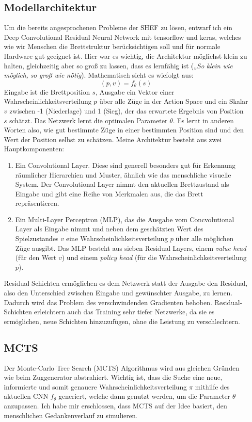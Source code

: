 \documentclass{jpp}
\begin{document}
\subsection{Modellarchitektur}
Um die bereits angesprochenen Probleme der SHEF zu lösen, entwarf ich ein Deep Convolutional Residual Neural Network mit tensorflow und keras, welches wie wir Menschen die Brettstruktur berücksichtigen soll und für normale Hardware gut geeignet ist. Hier war es wichtig, die Architektur möglichst klein zu halten, gleichzeitig aber so groß zu lassen, dass es lernfähig ist (\textit{„So klein wie möglich, so groß wie nötig}). Mathematisch sieht es wiefolgt aus:
\[(p, v) =  f_\theta(s)\]Eingabe ist die Brettposition $s$, Ausgabe ein Vektor einer Wahrscheinlichkeitsverteilung $p$ über alle Züge in der Action Space und ein Skalar $v$ zwischen -1 (Niederlage) und 1 (Sieg), der das erwartete Ergebnis von Position $s$ schätzt. Das Netzwerk lernt die optimalen Parameter $\theta$. Es lernt in anderen Worten also, wie gut bestimmte Züge in einer bestimmten Position sind und den Wert der Position selbst zu schätzen. 
Meine Architektur besteht aus zwei Hauptkomponenten:
\begin{enumerate}
\item Ein Convolutional Layer. Diese sind generell besonders gut für Erkennung räumlicher Hierarchien und Muster, ähnlich wie das menschliche visuelle System. Der Convolutional Layer nimmt den aktuellen Brettzustand als Eingabe und gibt eine Reihe von Merkmalen aus, die das Brett repräsentieren.
\item Ein Multi-Layer Perceptron (MLP), das die Ausgabe vom Concvolutional Layer als Eingabe nimmt und neben dem geschätzten Wert des Spielzustandes $v$ eine Wahrscheinlichkeitsverteilung $p$ über alle möglichen Züge ausgibt. Das MLP besteht aus sieben Residual Layers, einem \textit{value head} (für den Wert $v$) und einem \textit{policy head} (für die Wahrscheinlichkeitsverteilung $p$). 
\end{enumerate}
Residual-Schichten ermöglichen es dem Netzwerk statt der Ausgabe den Residual, also den Unterschied zwischen Eingabe und gewünschter Ausgabe, zu lernen. Dadurch wird das Problem des verschwindenden Gradienten behoben. Residual-Schichten erleichtern auch das Training sehr tiefer Netzwerke, da sie es ermöglichen, neue Schichten hinzuzufügen, ohne die Leistung zu verschlechtern. 

\subsection{MCTS}
Der Monte-Carlo Tree Search (MCTS) Algorithmus wird aus gleichen Gründen wie beim Zuggenerator abstrahiert. Wichtig ist, dass die Suche eine neue, informierte und somit genauere Wahrscheinlichkeitsverteilung $\pi$ mithilfe des aktuellen CNN $f_\theta$  generiert, welche dann genutzt werden, um die Parameter $\theta$ anzupassen. Ich habe mir erschlossen, dass MCTS auf der Idee basiert, den menschlichen Gedankenverlauf zu simulieren.
\end{document}
